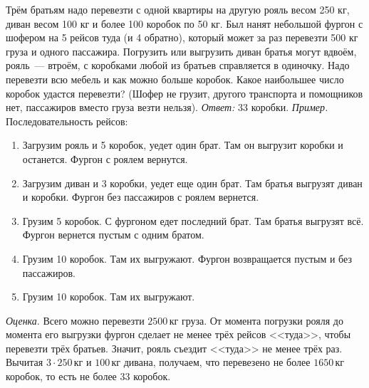 \problem
Трём братьям надо перевезти с одной квартиры на другую рояль весом 250 кг,
диван весом 100 кг и более 100 коробок по 50 кг.
Был нанят небольшой фургон с шофером на 5 рейсов туда (и 4 обратно), который
может за раз перевезти 500 кг груза и одного пассажира.
Погрузить или выгрузить диван братья могут вдвоём, рояль~--- втроём, с
коробками любой из братьев справляется в одиночку.
Надо перевезти всю мебель и как можно больше коробок.
Какое наибольшее число коробок удастся перевезти?
(Шофер не грузит, другого транспорта и помощников нет, пассажиров вместо груза
везти нельзя).
\solution
\emph{Ответ:} 33 коробки.
\emph{Пример.}
Последовательность рейсов:
\begin{enumerate}
\item
Загрузим рояль и 5 коробок, уедет один брат.
Там он выгрузит коробки и останется.
Фургон с роялем вернутся.
\item
Загрузим диван и 3 коробки, уедет еще один брат.
Там братья выгрузят диван и коробки.
Фургон без пассажиров с роялем вернется.
\item
Грузим 5 коробок.
С фургоном едет последний брат.
Там братья выгрузят всё.
Фургон вернется пустым с одним братом.
\item
Грузим 10 коробок.
Там их выгружают.
Фургон возвращается пустым и без пассажиров.
\item
Грузим 10 коробок.
Там их выгружают.
\end{enumerate}
\emph{Оценка}.
Всего можно перевезти $2500 \, \text{кг}$ груза.
От момента погрузки рояля до момента его выгрузки фургон сделает не менее трёх
рейсов <<туда>>, чтобы перевезти трёх братьев.
Значит, рояль съездит <<туда>> не менее трёх раз.
Вычитая $3 \cdot 250 \, \text{кг}$ и $100 \, \text{кг}$ дивана, получаем, что
перевезено не более $1650 \, \text{кг}$ коробок, то есть не более $33$ коробок.
\endproblem

